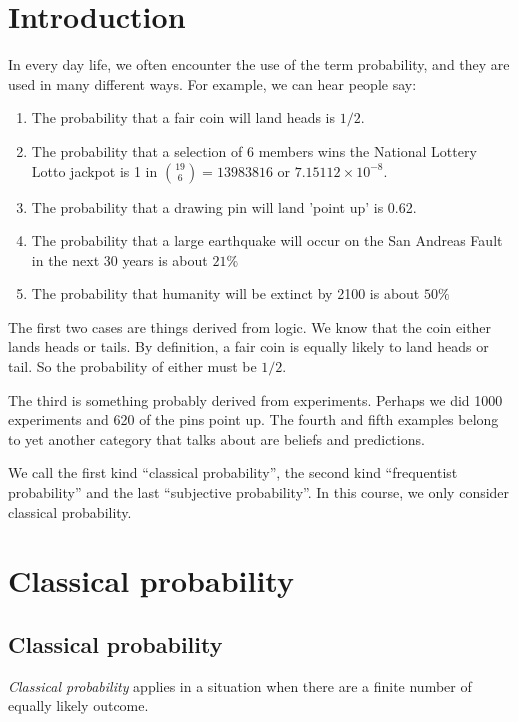 \documentclass[a4paper]{article}
\begin{document}
\tableofcontents
\setcounter{section}{-1}
\section{Introduction}
In every day life, we often encounter the use of the term probability, and they are used in many different ways. For example, we can hear people say:
\begin{enumerate}
  \item The probability that a fair coin will land heads is $1/2$.
  \item The probability that a selection of 6 members wins the National Lottery Lotto jackpot is 1 in $\binom{19}{6} = 13 983 816$ or $7.15112\times 10^{-8}$.
  \item The probability that a drawing pin will land 'point up' is 0.62.
  \item The probability that a large earthquake will occur on the San Andreas Fault in the next 30 years is about $21\%$
  \item The probability that humanity will be extinct by 2100 is about $50\%$
\end{enumerate}
The first two cases are things derived from logic. We know that the coin either lands heads or tails. By definition, a fair coin is equally likely to land heads or tail. So the probability of either must be $1/2$.

The third is something probably derived from experiments. Perhaps we did 1000 experiments and 620 of the pins point up. The fourth and fifth examples belong to yet another category that talks about are beliefs and predictions.

We call the first kind ``classical probability'', the second kind ``frequentist probability'' and the last ``subjective probability''. In this course, we only consider classical probability.

\section{Classical probability}
\subsection{Classical probability}
\begin{defi}
  \emph{Classical probability} applies in a situation when there are a finite number of equally likely outcome.
\end{defi}
\end{document}
